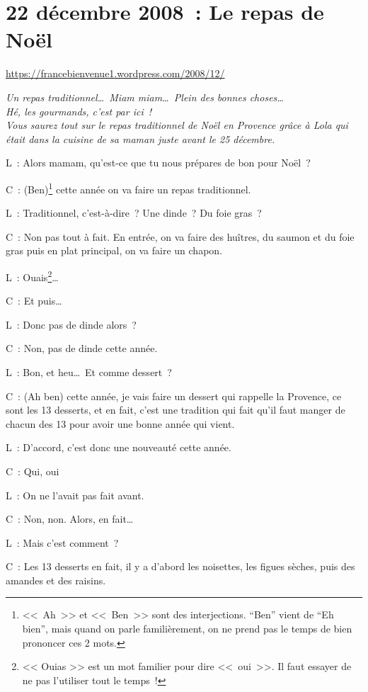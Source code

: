 \documentclass[11pt, french]{report}
\begin{document}
\chapter{22 décembre 2008~: Le repas de Noël}

\url{https://francebienvenue1.wordpress.com/2008/12/}

\vfill

\textit{Un repas traditionnel\ldots\ Miam miam\ldots\ Plein des bonnes
choses\ldots\ \\
Hé, les gourmands, c'est par ici~!\\
Vous saurez tout sur le repas traditionnel de Noël en Provence grâce à Lola
qui était dans la cuisine de sa maman juste avant le 25 décembre.} 

\vfill

L~: Alors mamam, qu'est-ce que tu nous prépares de bon pour Noël~?

C~: (Ben)\footnote{<<~Ah~>> et <<~Ben~>> sont des interjections.  ``Ben'' vient
  de ``Eh bien'', mais quand on parle familièrement, on ne prend pas le temps
  de bien prononcer ces 2 mots.} cette année on va faire un repas traditionnel.

L~: Traditionnel, c'est-à-dire~? Une dinde~? Du foie gras~?

C~: Non pas tout à fait.  En entrée, on va faire des huîtres, du saumon et
du foie gras puis en plat principal, on va faire un chapon.

L~: Ouais\footnote{<< Ouias >> est un mot familier pour dire <<~oui~>>.  Il faut
  essayer de ne pas l'utiliser tout le temps~!}\ldots

C~: Et puis\ldots

L~: Donc pas de dinde alors~?

C~: Non, pas de dinde cette année.

L~: Bon, et heu\ldots\ Et comme dessert~?

C~: (Ah ben) cette année, je vais faire un dessert qui rappelle la Provence, ce
sont les 13 desserts, et en fait, c'est une tradition qui fait qu'il faut manger
de chacun des 13 pour avoir une bonne année qui vient.

L~: D'accord, c'est donc une nouveauté cette année.

C~: Qui, oui

L~: On ne l’avait pas fait avant.

C~: Non, non. Alors, en fait\ldots

L~: Mais c’est comment~?

C~: Les 13 desserts en fait, il y a d’abord les noisettes, les figues sèches,
puis des amandes et des raisins.
\end{document}
